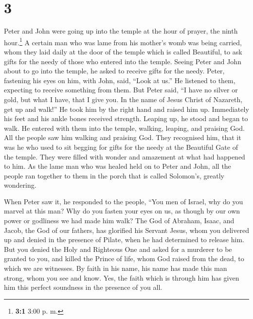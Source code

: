 \hypertarget{section-2}{%
\section{3}\label{section-2}}

 Peter and John were going up into the temple at the hour
of prayer, the ninth hour.\footnote{\textbf{3:1} 3:00 p. m.}
 A certain man who was lame from his mother's womb was
being carried, whom they laid daily at the door of the temple which is
called Beautiful, to ask gifts for the needy of those who entered into
the temple.  Seeing Peter and John about to go into the
temple, he asked to receive gifts for the needy.  Peter,
fastening his eyes on him, with John, said, ``Look at us.''
 He listened to them, expecting to receive something from
them.  But Peter said, ``I have no silver or gold, but
what I have, that I give you. In the name of Jesus Christ of Nazareth,
get up and walk!''  He took him by the right hand and
raised him up. Immediately his feet and his ankle bones received
strength.  Leaping up, he stood and began to walk. He
entered with them into the temple, walking, leaping, and praising God.
 All the people saw him walking and praising God.
 They recognised him, that it was he who used to sit
begging for gifts for the needy at the Beautiful Gate of the temple.
They were filled with wonder and amazement at what had happened to him.
 As the lame man who was healed held on to Peter and
John, all the people ran together to them in the porch that is called
Solomon's, greatly wondering.

 When Peter saw it, he responded to the people, ``You men
of Israel, why do you marvel at this man? Why do you fasten your eyes on
us, as though by our own power or godliness we had made him walk?
 The God of Abraham, Isaac, and Jacob, the God of our
fathers, has glorified his Servant Jesus, whom you delivered up and
denied in the presence of Pilate, when he had determined to release him.
 But you denied the Holy and Righteous One and asked for
a murderer to be granted to you,  and killed the Prince
of life, whom God raised from the dead, to which we are witnesses.
 By faith in his name, his name has made this man strong,
whom you see and know. Yes, the faith which is through him has given him
this perfect soundness in the presence of you all.

